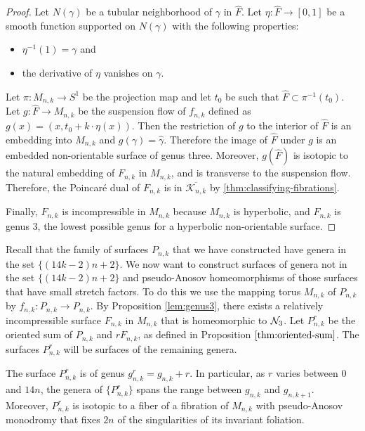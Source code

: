 \begin{proof}
  Let $N(\gamma)$ be a tubular neighborhood of $\gamma$ in $\widehat{F}$.  Let $\eta: \widehat{F} \xrightarrow{} [0,1]$ be a smooth function supported on $N(\gamma)$ with the following properties:
  \begin{itemize}
      \item $\eta^{-1}(1) = \gamma$ and
      \item the derivative of $\eta$ vanishes on $\gamma$.
    \end{itemize}
Let $\pi:M_{n,k}\rightarrow S^1$ be the projection map and let $t_0$ be such that $\widehat{F}\subset\pi^{-1}(t_0)$.  Let $g: \widehat{F} \xrightarrow{} M_{n,k}$ be the suspension flow of $f_{n,k}$ defined as $g(x) =(x,t_0+k\cdot\eta(x))$. Then the restriction of $g$ to the interior of $\widehat{F}$ is an embedding into $M_{n,k}$ and $g(\gamma) = \widehat{\gamma}$. Therefore the image of $\widehat{F}$ under $g$ is an embedded non-orientable surface of genus three. Moreover, $g(\widehat{F})$ is isotopic to the natural embedding of $F_{n,k}$ in $M_{n,k}$, and is transverse to the suspension flow.
  Therefore, the Poincar\'e dual of $F_{n,k}$ is in $\overline{\mathcal{K}_{n,k}}$ by \autoref{thm:classifying-fibrations}.

  Finally, $F_{n,k}$ is incompressible in $M_{n,k}$ because $M_{n,k}$ is hyperbolic, and $F_{n,k}$ is genus $3$, the
  lowest possible genus for a hyperbolic non-orientable surface.
\end{proof}



Recall that the family of surfaces $P_{n,k}$ that we have constructed have genera in the set $\{(14k-2)n+2\}$.
We now want to construct surfaces of genera not in the set $\{(14k-2)n+2\}$ and pseudo-Anosov homeomorphisms of those surfaces that have small stretch factors.  To do this we use the mapping torus $M_{n,k}$ of $P_{n,k}$ by $f_{n,k}:P_{n,k}\to P_{n,k}$. By Proposition \ref{lem:genus3}, there exists a relatively incompressible surface $F_{n,k}$ in $M_{n,k}$ that is homeomorphic to $\mathcal{N}_3$.  Let $P_{n,k}^r$ be the oriented sum of $P_{n,k}$ and
$rF_{n,k}$, as defined in Proposition $\ref{thm:oriented-sum}$.  The surfaces $P_{n,k}^r$ will be surfaces of the remaining genera.

\begin{lem}
  The surface $P^r_{n,k}$ is of genus $g^r_{n,k} = g_{n,k} + r$. In particular, as $r$ varies between
  $0$ and $14n$, the genera of $\{P^r_{n,k}\}$ spans the range between $g_{n,k}$ and $g_{n,k+1}$. Moreover,
  $P^r_{n,k}$ is isotopic to a fiber of a fibration of $M_{n,k}$ with pseudo-Anosov monodromy that fixes $2n$
  of the singularities of its invariant foliation.
\end{lem}

